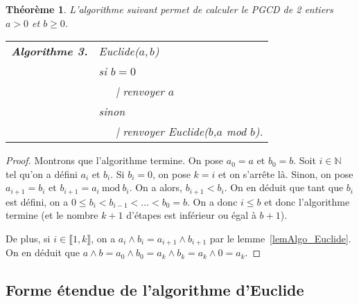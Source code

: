 \documentclass[12pt]{report}
\newtheorem*{qst}{Question}
\newtheorem*{rep}{Réponse}
\newtheorem{thm}{Théorème}[chapter]
\newcommand{\N}{\mathbb{N}}
\begin{document}
\begin{thm}\label{thmAlgorithme_d_euclide}
L'algorithme suivant permet de calculer le PGCD de 2 entiers $a>0$ et $b \geq 0$.\\

\begin{tabular}{ll}
\textbf{Algorithme 3.} & Euclide($a,b$)\\
 & si $b=0$     \\
 & \ \ \ {\rm |} renvoyer $a$  \\
 & sinon   \\ 
 & \ \ \ {\rm |  } renvoyer Euclide($b$,$a$ mod $b$).
\end{tabular}
\end{thm}

\begin{proof}
Montrons que l'algorithme termine. On pose $a_0=a$ et $b_0=b$. Soit $i\in \N$ tel qu'on a défini $a_i$ et $b_i$. Si $b_i=0$, on pose $k=i$ et on s'arrête là. Sinon, on pose $a_{i+1}=b_i$ et $b_{i+1}=a_i\mathrm{\ mod\ }b_i$. On a alors, $b_{i+1}< b_i$. On en déduit que tant que $b_i$ est défini, on a $0\leq b_i<b_{i-1}<\ldots < b_0=b$. On a donc $i\leq b$ et donc l'algorithme termine (et le nombre $k+1$ d'étapes est inférieur ou égal à $b+1$). 

De plus, si $i\in \llbracket 1,k\rrbracket$, on a $a_i\wedge b_i=a_{i+1}\wedge b_{i+1}$ par le lemme~\ref{lemAlgo_Euclide}. On en déduit que $a\wedge b= a_0\wedge b_0=a_k\wedge b_k =a_k\wedge 0=a_k$.
\end{proof}



\subsection{Forme étendue de l'algorithme d'Euclide}

\end{document}
